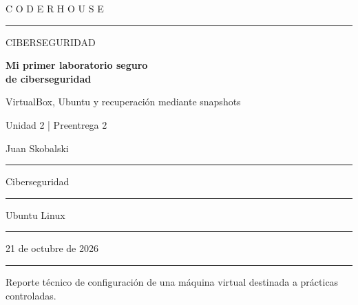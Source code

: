 \documentclass[11pt,a4paper]{article}
\begin{document}
\thispagestyle{empty}
\vspace*{1.0cm}
{\color{turquesa}\large C O D E R H O U S E}\par
\vspace{0.4cm}
{\color{linea}\rule{\textwidth}{1.2pt}}\par
\vspace{2.1cm}
{\color{gris}\Large CIBERSEGURIDAD}\par
\vspace{0.45cm}
{\color{azul}\Huge\bfseries Mi primer laboratorio seguro\\[5pt] de ciberseguridad}\par
\vspace{0.45cm}
{\color{turquesa}\LARGE VirtualBox, Ubuntu y recuperación mediante snapshots}\par
\vspace{1.0cm}
{\color{gris}\large Unidad 2 | Preentrega 2}\par

\vfill
\noindent\colorbox{fondo}{%
  \begin{minipage}{\dimexpr\textwidth-2\fboxsep}
    \vspace{0.28cm}
    \noindent{}Juan Skobalski\par
    \vspace{0.18cm}\color{linea}\hrule\color{black}\vspace{0.18cm}
    \noindent{}Ciberseguridad\par
    \vspace{0.18cm}\color{linea}\hrule\color{black}\vspace{0.18cm}
    \noindent{}Ubuntu Linux\par
    \vspace{0.18cm}\color{linea}\hrule\color{black}\vspace{0.18cm}
    \noindent{}21 de octubre de 2026\par
    \vspace{0.28cm}
  \end{minipage}}
\vspace{0.75cm}
{\color{linea}\rule{\textwidth}{1.2pt}}\par
\vspace{0.25cm}
{\small\color{gris}Reporte técnico de configuración de una máquina virtual destinada a prácticas controladas.}
\end{document}
